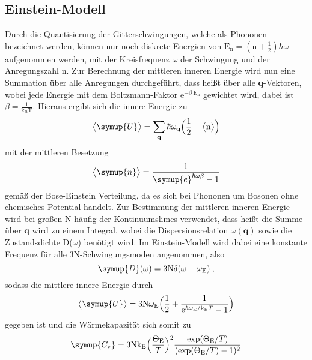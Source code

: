 \subsection{Einstein-Modell}
Durch die Quantisierung der Gitterschwingungen, welche als Phononen bezeichnet
werden, können nur noch diskrete Energien von $ \text{E}_{\text{n}}=(\text{n}+\frac{1}{2})
\hbar \omega $ aufgenommen werden, mit der Kreisfrequenz $\omega$ der Schwingung
und der Anregungszahl n. Zur Berechnung der mittleren inneren Energie wird nun eine Summation
über alle Anregungen durchgeführt, dass heißt über alle
\textbf{q}-Vektoren, wobei jede Energie mit dem Boltzmann-Faktor
$\text{e}^{-\beta \:\text{E}_{\text{n}}}$ gewichtet wird, dabei ist
$\beta= \frac{1}{\text{k}_{\text{B}}\text{T}}$.
Hieraus ergibt sich die innere Energie zu
\begin{equation}
  \bigl<\symup{U}\bigr> = \sum_{\textbf{q}}\hbar\omega_{\textbf{q}}\Bigl(\frac{1}{2}+\bigl<\text{n}\bigr>\Bigr)
  \label{eqn:Uqm}
\end{equation}
mit der mittleren Besetzung
\begin{equation}
  \bigl<\symup{n}\bigr> =  \frac{1}{\symup{e}^{\hbar\omega\beta}-1}
  \label{eqn:boseeinstein}
\end{equation}
gemäß der Bose-Einstein Verteilung, da es sich bei Phononen um Bosonen ohne
chemisches Potential handelt.
Zur Bestimmung der mittleren inneren Energie wird bei großen N häufig der Kontinuumslimes
verwendet, dass heißt die Summe über $\textbf{q}$ wird zu einem Integral, wobei die
Dispersionsrelation $\omega(\textbf{q})$ sowie die Zustandsdichte D($\omega$)
benötigt wird.
Im Einstein-Modell wird dabei eine konstante Frequenz
für alle 3N-Schwingungsmoden angenommen, also
\begin{equation}
  \symup{D}(\omega) = 3\text{N}\delta(\omega-\omega_{\text{E}}) \: ,
  \label{eqn:zdeinst}
\end{equation}
sodass die mittlere innere Energie durch
\begin{equation}
  \bigl<\symup{U}\bigr> = 3\text{N}\omega_{\text{E}}\Bigl(\frac{1}{2}+\frac{1}{\text{e}^{\hbar\omega_{\text{E}}/
  \text{k}_{\text{B}}T}-1}\Bigr)
  \label{eqn:Uein}
\end{equation}
gegeben ist
und die Wärmekapazität sich somit zu
\begin{equation}
  \symup{C_{\text{v}}} = 3\text{N}\text{k}_{\text{B}}\Bigl(\frac{\Theta_{\text{E}}}{T}\Bigr)^2
  \frac{\text{exp}(\Theta_{\text{E}}/T)}{(\text{exp}(\Theta_{\text{E}}/T)-1)^2}
  \label{eqn:Cein}
\end{equation}
